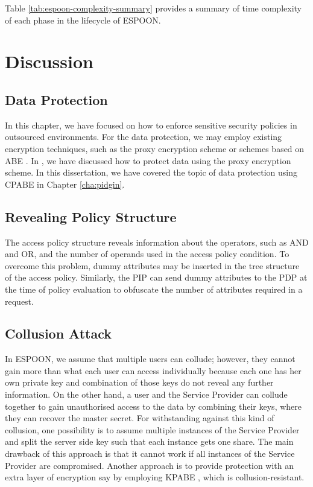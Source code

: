 \documentclass[epsfig,a4paper,11pt,titlepage]{book}
\numberwithin{algorithm}{chapter}
\begin{document}
Table \ref{tab:espoon-complexity-summary} provides a summary of time complexity of each phase in the lifecycle of \gls{ESPOON}.


\section{Discussion}
\label{sec:espoon-discussion}


\subsection{Data Protection}
In this chapter, we have focused on how to enforce sensitive security policies in outsourced environments. For the data protection, we may employ existing encryption techniques, such as the proxy encryption scheme \cite{Dong:2011} or schemes based on \gls{ABE} \cite{Bethencourt:2007, Goyal:2006}. In \cite{Asghar2013:CCSW}, we have discussed how to protect data using the proxy encryption scheme. In this dissertation, we have covered the topic of data protection using \gls{CPABE} \cite{Bethencourt:2007} in Chapter \ref{cha:pidgin}.

\subsection{Revealing Policy Structure}
The access policy structure reveals information about the operators, such as AND and OR, and the number of operands used in the access policy condition. To overcome this problem, dummy attributes may be inserted in the tree structure of the access policy. Similarly, the \gls{PIP} can send dummy attributes to the \gls{PDP} at the time of policy evaluation to obfuscate the number of attributes required in a request.

\subsection{Collusion Attack}
In \gls{ESPOON}, we assume that multiple users can collude; however, they cannot gain more than what each user can access individually because each one has her own private key and combination of those keys do not reveal any further information. On the other hand, a user and the Service Provider can collude together to gain unauthorised access to the data by combining their keys, where they can recover the master secret. For withstanding against this kind of collusion, one possibility is to assume multiple instances of the Service Provider and split the server side key such that each instance gets one share. The main drawback of this approach is that it cannot work if all instances of the Service Provider are compromised. Another approach is to provide protection with an extra layer of encryption say by employing \gls{KPABE} \cite{Goyal:2006}, which is collusion-resistant.
\end{document}
